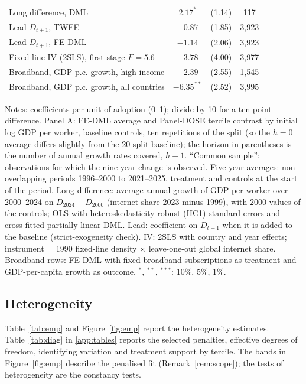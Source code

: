\documentclass[pdflatex,sn-basic]{sn-jnl}%
\theoremstyle{thmstyleone}
\theoremstyle{thmstyletwo}
\renewenvironment{table}[1][]{\begin{tableorg}[#1]\centering\tablebodyfont}{\end{tableorg}}
\begin{document}
\begin{table}[!t]
{\begin{threeparttable}
\begin{tabular}{lccccccc}
Long difference, DML & $2.17^{*}$ & (1.14) & 117 \\
Lead $D_{t+1}$, TWFE & $-0.87$ & (1.85) & 3,923 \\
Lead $D_{t+1}$, FE-DML & $-1.14$ & (2.06) & 3,923 \\
Fixed-line IV (2SLS), first-stage $F=5.6$ & $-3.78$ & (4.00) & 3,977 \\
Broadband, GDP p.c. growth, high income & $-2.39$ & (2.55) & 1,545 \\
Broadband, GDP p.c. growth, all countries & $-6.35^{**}$ & (2.52) & 3,995 \\
\bottomrule
\end{tabular}
\begin{tablenotes}\footnotesize
\item Notes: coefficients per unit of adoption (0--1); divide by 10 for a ten-point difference. Panel A: FE-DML average and Panel-DOSE tercile contrast by initial log GDP per worker, baseline controls, ten repetitions of the split (so the $h=0$ average differs slightly from the 20-split baseline); the horizon in parentheses is the number of annual growth rates covered, $h+1$. ``Common sample'': observations for which the nine-year change is observed. Five-year averages: non-overlapping periods 1996--2000 to 2021--2025, treatment and controls at the start of the period. Long difference: average annual growth of GDP per worker over 2000--2024 on $D_{2024}-D_{2000}$ (internet share 2023 minus 1999), with 2000 values of the controls; OLS with heteroskedasticity-robust (HC1) standard errors and cross-fitted partially linear DML. Lead: coefficient on $D_{t+1}$ when it is added to the baseline (strict-exogeneity check). IV: 2SLS with country and year effects; instrument = 1990 fixed-line density $\times$ leave-one-out global internet share. Broadband rows: FE-DML with fixed broadband subscriptions as treatment and GDP-per-capita growth as outcome. $^{*}$, $^{**}$, $^{***}$: 10\%, 5\%, 1\%.
\end{tablenotes}
\end{threeparttable}}
\end{table}

\subsection{Heterogeneity}

Table~\ref{tab:emp} and Figure~\ref{fig:emp} report the heterogeneity estimates. Table~\ref{tab:diag} in \ref{app:tables} reports the selected penalties, effective degrees of freedom, identifying variation and treatment support by tercile. The bands in Figure~\ref{fig:emp} describe the penalised fit (Remark~\ref{rem:scope}); the tests of heterogeneity are the constancy tests.
\end{document}
